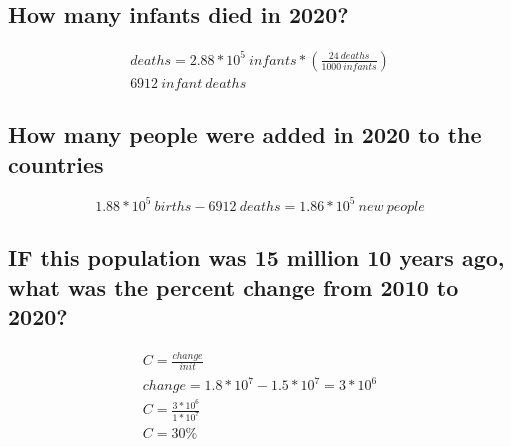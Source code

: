 \documentclass{article}
\begin{document}
\subsection{How many infants died in 2020?}

\begin{gather}
    deaths = 2.88 * 10^5\ infants * \left(\frac{24\ deaths}{1000\ infants}\right) \\
    6912\  infant\ deaths
\end{gather}

\subsection{How many people were added in 2020 to the countries}

\begin{equation}
    1.88 * 10^5\ births - 6912\ deaths = 1.86 * 10^5\ new\ people
 \end{equation}

\subsection{IF this population was 15 million 10 years ago, what was the
percent change from 2010 to 2020?}

\begin{gather}
    C = \frac{change}{init} \\
    change = 1.8 * 10^7 - 1.5 * 10^7 = 3 * 10^6 \\
    C = \frac{3 * 10^6}{1 * 10^7} \\
    C = 30\%
\end{gather}
\end{document}
